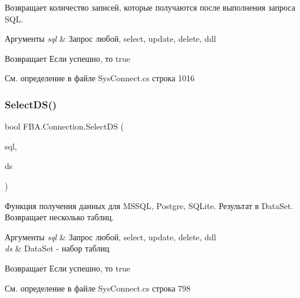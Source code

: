 Возвращает количество записей, которые получаются после выполнения запроса S\+QL. 


\begin{DoxyParams}{Аргументы}
{\em sql} & Запрос любой, select, update, delete, ddl\\
\hline
\end{DoxyParams}
\begin{DoxyReturn}{Возвращает}
Если успешно, то true
\end{DoxyReturn}


См. определение в файле Sys\+Connect.\+cs строка 1016

\mbox{\label{class_f_b_a_1_1_connection_a05684a6c70de969923339bbaebe82f5f}} 
\subsubsection{\texorpdfstring{Select\+D\+S()}{SelectDS()}\hspace{0.1cm}{\footnotesize\ttfamily [1/2]}}
{\footnotesize\ttfamily bool F\+B\+A.\+Connection.\+Select\+DS (\begin{DoxyParamCaption}\item[{string}]{sql,  }\item[{out Data\+Set}]{ds }\end{DoxyParamCaption})}



Функция получения данных для M\+S\+S\+QL, Postgre, S\+Q\+Lite. Результат в Data\+Set. Возвращает несколько таблиц. 


\begin{DoxyParams}{Аргументы}
{\em sql} & Запрос любой, select, update, delete, ddl\\
\hline
{\em ds} & Data\+Set -\/ набор таблиц\\
\hline
\end{DoxyParams}
\begin{DoxyReturn}{Возвращает}
Если успешно, то true
\end{DoxyReturn}


См. определение в файле Sys\+Connect.\+cs строка 798

\mbox{\label{class_f_b_a_1_1_connection_ae384f24ee6f026cd580a76202560445a}} 
